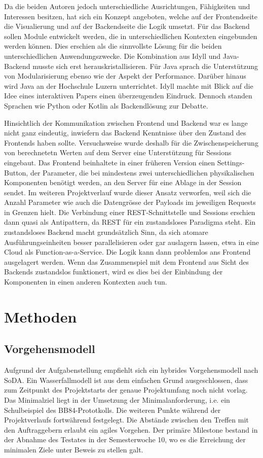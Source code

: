 \documentclass[a4paper,10.2pt,pdftex]{scrartcl}%
\begin{document}
Da die beiden Autoren jedoch unterschiedliche Ausrichtungen, Fähigkeiten und Interessen besitzen, hat sich ein Konzept angeboten, welche auf der Frontendseite die Visualierung und auf der Backendseite die Logik umsetzt. Für das Backend sollen Module entwickelt werden, die in unterschiedlichen Kontexten eingebunden werden können. Dies erschien als die sinnvollste Lösung für die beiden unterschiedlichen Anwendungszwecke. Die Kombination aus Idyll und Java-Backend musste sich erst herauskristallisieren. Für Java sprach die Unterstützung von Modularisierung ebenso wie der Aspekt der Performance. Darüber hinaus wird Java an der Hochschule Luzern unterrichtet. Idyll machte mit Blick auf die Idee eines interaktiven Papers einen überzeugenden Eindruck. Dennoch standen Sprachen wie Python oder Kotlin als Backendlösung zur Debatte. 

Hinsichtlich der Kommunikation zwischen Frontend und Backend war es lange nicht ganz eindeutig, inwiefern das Backend Kenntnisse über den Zustand des Frontends haben sollte. Versuchsweise wurde deshalb für die Zwischenspeicherung von berechnetetn Werten auf dem Server eine Unterstützung für Sessions eingebaut. Das Frontend beinhaltete in einer früheren Version einen Settings-Button, der Parameter, die bei mindestens zwei unterschiedlichen physikalischen Komponenten benötigt werden, an den Server für eine Ablage in der Session sendet. Im weiteren Projektverlauf wurde dieser Ansatz verworfen, weil sich die Anzahl Parameter wie auch die Datengrösse der Payloads im jeweiligen Requests in Grenzen hielt. Die Verbindung einer REST-Schnittstelle und Sessions erschien dann quasi als Antipattern, da REST für ein zustandsloses Paradigma steht. Ein zustandsloses Backend macht grundsätzlich Sinn, da sich atomare Ausführungseinheiten besser parallelisieren oder gar auslagern lassen, etwa in eine Cloud als Function-as-a-Service. Die Logik kann dann problemlos ans Frontend ausgelagert werden. Wenn das Zusammenspiel mit dem Frontend  aus Sicht des Backends zustandslos funktionert, wird es dies bei der Einbindung der Komponenten in einen anderen Kontexten auch tun. 

\section{Methoden}
\subsection{Vorgehensmodell}
Aufgrund der Aufgabenstellung empfiehlt sich ein hybrides Vorgehensmodell nach SoDA. Ein Wasserfallmodell ist aus dem einfachen Grund ausgeschlossen, dass zum Zeitpunkt des Projektstarts der genaue Projektumfang noch nicht vorlag. Das Minimalziel liegt in der Umsetzung der Minimalanforderung, i.e. ein Schulbeispiel des BB84-Prototkolls. Die weiteren Punkte während der Projektverlaufs fortwährend festgelegt. Die Abstände zwischen den Treffen mit den Auftraggebern erlaubt ein agiles Vorgehen. Der primäre Milestone bestand in der Abnahme des Testates in der Semesterwoche 10, wo es die Erreichung der minimalen Ziele unter Beweis zu stellen galt.
\end{document}

